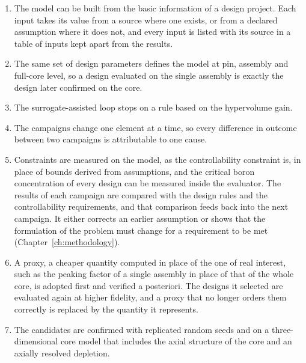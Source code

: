 \begin{enumerate}
  \item The model can be built from the basic information of a design
        project. Each input takes its value from a source where one
        exists, or from a declared assumption where it does not, and
        every input is listed with its source in a table of inputs kept
        apart from the results.

  \item The same set of design parameters defines the model at pin,
        assembly and full-core level, so a design evaluated on the single
        assembly is exactly the design later confirmed on the core.

  \item The surrogate-assisted loop stops on a rule based on the
        hypervolume gain.

  \item The campaigns change one element at a time, so every difference
        in outcome between two campaigns is attributable to one cause.

  \item Constraints are measured on the model, as the controllability
        constraint is, in place of bounds derived from assumptions, and the
        critical boron concentration of every design can be measured
        inside the evaluator. The results of each campaign are compared
        with the design rules and the controllability requirements, and
        that comparison feeds back into the next campaign. It either
        corrects an earlier assumption or shows that the formulation of
        the problem must change for a requirement to be met
        (Chapter~\ref{ch:methodology}).

  \item A proxy, a cheaper quantity computed in place of the one of real
        interest, such as the peaking factor of a single assembly in
        place of that of the whole core, is adopted first and verified
        a posteriori. The designs it selected are evaluated again at
        higher fidelity, and a proxy that no longer orders them correctly
        is replaced by the quantity it represents.

  \item The candidates are confirmed with replicated random seeds and on
        a three-dimensional core model that includes the axial structure
        of the core and an axially resolved depletion.
\end{enumerate}

